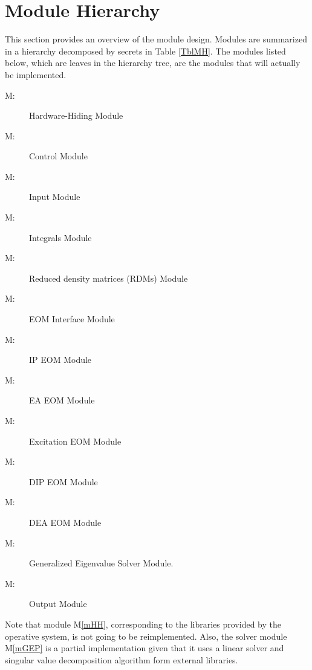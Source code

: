 \documentclass[12pt, titlepage]{article}
\newcounter{mnum}
\newcommand{\mthemnum}{M\themnum}
\begin{document}
\section{Module Hierarchy} \label{SecMH}

This section provides an overview of the module design. Modules are summarized
in a hierarchy decomposed by secrets in Table \ref{TblMH}. The modules listed
below, which are leaves in the hierarchy tree, are the modules that will
actually be implemented.

\begin{description}
\item [ \mthemnum \label{mHH}:] Hardware-Hiding Module
\item [ \mthemnum \label{mDriver}:] Control Module
\item [ \mthemnum \label{mInput}:] Input Module
\item [ \mthemnum \label{mIntegrals}:] Integrals Module
\item [ \mthemnum \label{mRDMs}:] Reduced density matrices 
(RDMs) Module 
\item [ \mthemnum \label{mEOM}:] EOM Interface Module
\item [ \mthemnum \label{mEOMIP}:] IP EOM Module
\item [ \mthemnum \label{mEOMEA}:] EA EOM Module
\item [ \mthemnum \label{mEOMExc}:] Excitation EOM Module
\item [ \mthemnum \label{mEOMDIP}:] DIP EOM Module
\item [ \mthemnum \label{mEOMDEA}:] DEA EOM Module
\item [ \mthemnum \label{mGEP}:] Generalized Eigenvalue 
Solver Module.
\item [ \mthemnum \label{mOutput}:] Output Module
\end{description}
Note that module M\ref{mHH}, corresponding to the libraries provided by the 
operative system, is not going to be reimplemented. Also, the solver module 
M\ref{mGEP} is a partial implementation given that it uses a linear solver and 
singular value decomposition algorithm form external libraries.
\end{document}
